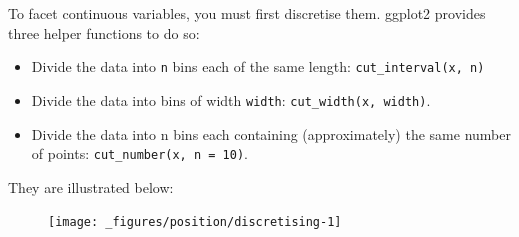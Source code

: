 To facet continuous variables, you must first discretise them. ggplot2
provides three helper functions to do so:

\begin{itemize}
\item
  Divide the data into \texttt{n} bins each of the same length:
  \texttt{cut\_interval(x,\ n)} 
\item
  Divide the data into bins of width \texttt{width}:
  \texttt{cut\_width(x,\ width)}. 
\item
  Divide the data into n bins each containing (approximately) the same
  number of points: \texttt{cut\_number(x,\ n\ =\ 10)}.
\end{itemize}

They are illustrated below:

\begin{Shaded}
\begin{Highlighting}[]
\StringTok{ }\NormalTok{)}
\StringTok{ }\NormalTok{)}
\StringTok{ }\NormalTok{)}

\StringTok{ }
\StringTok{  }\NormalTok{() +}
\StringTok{  }\NormalTok{(} \NormalTok{, } \NormalTok{)}
\StringTok{ } \NormalTok{)}
\end{Highlighting}
\end{Shaded}

\begin{figure}[H]
  \texttt{[image: \_figures/position/discretising-1]}%
\end{figure}

\begin{Shaded}
\begin{Highlighting}[]
\StringTok{ } \NormalTok{)}
\end{Highlighting}
\end{Shaded}

